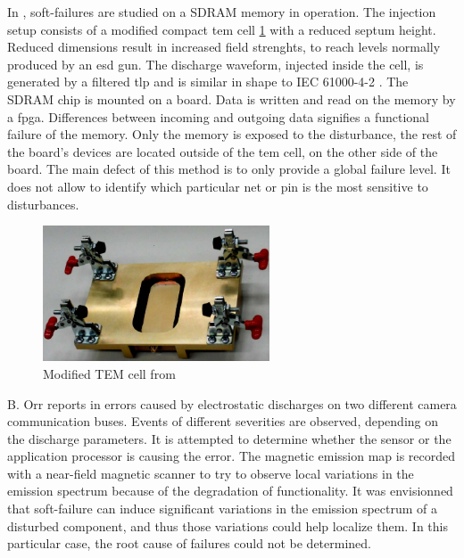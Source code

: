 In \cite{SDRAMCase}, soft-failures are studied on a SDRAM memory in operation.
The injection setup consists of a modified compact \gls{tem} cell \ref{fig:modified-tem-cell} with a reduced septum height.
Reduced dimensions result in increased field strenghts, to reach levels normally produced by an \gls{esd} gun.
The discharge waveform, injected inside the cell, is generated by a filtered \gls{tlp} and is similar in shape to IEC 61000-4-2 \cite{iec61000-4-2}.
The SDRAM chip is mounted on a board.
Data is written and read on the memory by a \gls{fpga}.
Differences between incoming and outgoing data signifies a functional failure of the memory.
Only the memory is exposed to the disturbance, the rest of the board's devices are located outside of the \gls{tem} cell, on the other side of the board.
The main defect of this method is to only provide a global failure level.
It does not allow to identify which particular net or pin is the most sensitive to disturbances.

\begin{figure}[!h]
  \centering
  \includegraphics[width=0.6\textwidth]{src/1/figures/modified_tem_cell.png}
  \caption{Modified TEM cell from \cite{SDRAMCase}}
  \label{fig:modified-tem-cell}
\end{figure}

B. Orr reports in \cite{softFailSubsystem} errors caused by electrostatic discharges on two different camera communication buses.
Events of different severities are observed, depending on the discharge parameters.
It is attempted to determine whether the sensor or the application processor is causing the error.
The magnetic emission map is recorded with a near-field magnetic scanner to try to observe local variations in the emission spectrum because of the degradation of functionality.
It was envisionned that soft-failure can induce significant variations in the emission spectrum of a disturbed component, and thus those variations could help localize them.
In this particular case, the root cause of failures could not be determined.

